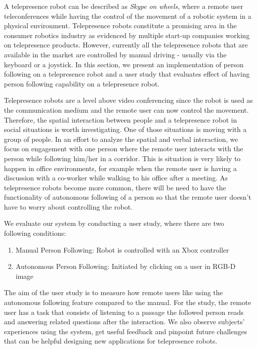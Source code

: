 A telepresence robot can be described as \textit{Skype on wheels}, where a remote user teleconferences while having the control of the movement of a robotic system in a physical environment. Telepresence robots constitute a promising area in the consumer robotics industry as evidenced by multiple start-up companies working on telepresence products. However, currently all the telepresence robots that are available in the market are controlled by manual driving - usually via the keyboard or a joystick. In this section, we present an implementation of person following on a telepresence robot and a user study that evaluates effect of having person following capability on a telepresence robot.

Telepresence robots are a level above video conferencing since the robot is used as the communication medium and the remote user can now control the movement. Therefore, the spatial interaction between people and a telepresence robot in social situations is worth investigating. One of those situations is moving with a group of people. In an effort to analyze the spatial and verbal interaction, we focus on engagement with one person where the remote user interacts with the person while following him/her in a corridor. This is situation is very likely to happen in office environments, for example when the remote user is having a discussion with a co-worker while walking to his office after a meeting. As telepresence robots become more common, there will be need to have the functionality of autonomous following of a person so that the remote user doesn't have to worry about controlling the robot.

We evaluate our system by conducting a user study, where there are two following conditions:

\begin{enumerate}
\item Manual Person Following: Robot is controlled with an Xbox controller
\item Autonomous Person Following: Initiated by clicking on a user in RGB-D image
\end{enumerate}

The aim of the user study is to measure how remote users like using the autonomous following feature compared to the manual. For the study, the remote user has a task that consists of listening to a passage the followed person reads and answering related questions after the interaction. We also observe subjects' experiences using the system, get useful feedback and pinpoint future challenges that can be helpful designing new applications for telepresence robots.

